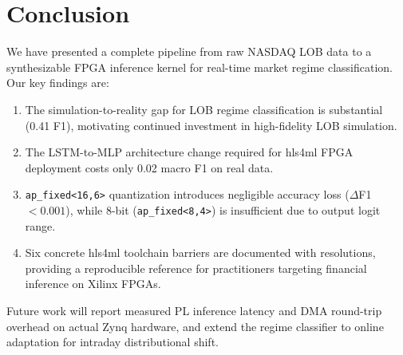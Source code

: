 \documentclass[conference]{IEEEtran}
\begin{document}
\section{Conclusion}
\label{sec:conclusion}

We have presented a complete pipeline from raw NASDAQ LOB data to a synthesizable
FPGA inference kernel for real-time market regime classification.
Our key findings are:
\begin{enumerate}
  \item The simulation-to-reality gap for LOB regime classification is substantial
        (0.41 F1), motivating continued investment in high-fidelity LOB simulation.
  \item The LSTM-to-MLP architecture change required for hls4ml FPGA deployment
        costs only 0.02 macro F1 on real data.
  \item \texttt{ap\_fixed<16,6>} quantization introduces negligible accuracy loss
        ($\Delta$F1 $< 0.001$), while 8-bit (\texttt{ap\_fixed<8,4>}) is
        insufficient due to output logit range.
  \item Six concrete hls4ml toolchain barriers are documented with resolutions,
        providing a reproducible reference for practitioners targeting financial
        inference on Xilinx FPGAs.
\end{enumerate}

Future work will report measured PL inference latency and DMA round-trip overhead
on actual Zynq hardware, and extend the regime classifier to online adaptation
for intraday distributional shift.



\end{document}
